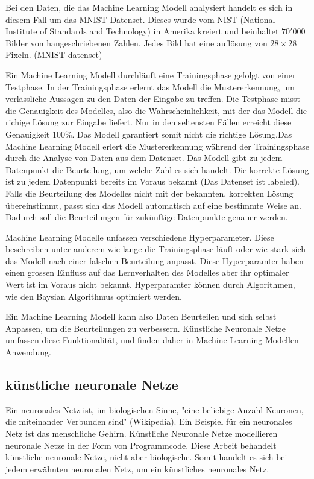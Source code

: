 Bei den Daten, die das Machine Learning Modell analysiert handelt es sich in
diesem Fall um das MNIST Datenset. Dieses wurde vom NIST (National Institute of
Standards and Technology) in Amerika kreiert und beinhaltet $70'000$ Bilder von
hangeschriebenen Zahlen. Jedes Bild hat eine auflösung von $28\times28$ Pixeln.
(MNIST datenset)                                 %

Ein Machine Learning Modell durchläuft eine Trainingsphase gefolgt von einer
Testphase. In der Trainingsphase erlernt das Modell die Mustererkennung, um
verlässliche Aussagen zu den Daten der Eingabe zu treffen. Die Testphase misst
die Genauigkeit des Modelles, also die Wahrscheinlichkeit, mit der das Modell
die richige Lösung zur Eingabe liefert. Nur in den seltensten Fällen erreicht
diese Genauigkeit $100\%$. Das Modell garantiert somit nicht die richtige
Lösung.Das Machine Learning Modell erlert die Mustererkennung während der
Trainingsphase durch die Analyse von Daten aus dem Datenset. Das Modell gibt zu
jedem Datenpunkt die Beurteilung, um welche Zahl es sich handelt. Die korrekte
Lösung ist zu jedem Datenpunkt bereits im Voraus bekannt (Das Datenset ist
labeled). Falls die Beurteilung des Modelles nicht mit der bekannten, korrekten
Lösung übereinstimmt, passt sich das Modell automatisch auf eine bestimmte Weise
an. Dadurch soll die Beurteilungen für zukünftige Datenpunkte genauer werden.

Machine Learning Modelle unfassen verschiedene Hyperparameter. Diese beschreiben
unter anderem wie lange die Trainingsphase läuft oder wie stark sich das Modell
nach einer falschen Beurteilung anpasst. Diese Hyperparamter haben einen grossen
Einfluss auf das Lernverhalten des Modelles aber ihr optimaler Wert ist im
Voraus nicht bekannt. Hyperparamter können durch Algorithmen, wie den Baysian
Algorithmus optimiert werden.

Ein Machine Learning Modell kann also Daten Beurteilen und sich selbst Anpassen,
um die Beurteilungen zu verbessern. Künstliche Neuronale Netze umfassen diese
Funktionalität, und finden daher in Machine Learning Modellen Anwendung.


\subsection*{künstliche neuronale Netze}

Ein neuronales Netz ist, im biologischen Sinne, "eine beliebige Anzahl Neuronen,
die miteinander Verbunden sind" (Wikipedia). Ein Beispiel für ein neuronales
Netz ist das menschliche Gehirn. Künstliche Neuronale Netze modellieren
neuronale Netze in der Form von Programmcode. Diese Arbeit behandelt künstliche
neuronale Netze, nicht aber biologische. Somit handelt es sich bei jedem
erwähnten neuronalen Netz, um ein künstliches neuronales Netz.

